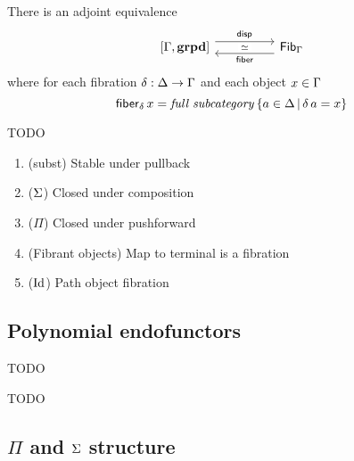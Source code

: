 \begin{prop}
  There is an adjoint equivalence
  \[\begin{tikzcd}
    {[\Ga, \grpd]} && {\Fib_\Ga}
    \arrow["{\disp{}}", shift left=2, from=1-1, to=1-3]
    \arrow["\simeq"{description}, draw=none, from=1-1, to=1-3]
    \arrow["{\fiber}", shift left=2, from=1-3, to=1-1]
  \end{tikzcd}\]
  where for each fibration $\delta : \Delta \to \Gamma$ and each
  object $x \in \Gamma$
  \[\mathsf{fiber}_{\delta} \, x = \text{\emph {full subcategory}} \, \{a \in \Delta \,|\, \delta \, a = x\}\]
\end{prop}

\medskip

\begin{prop}
  TODO
  \begin{enumerate}
    \item (\textsf{subst}) Stable under pullback
    \item ($\Sigma$) Closed under composition
    \item ($\Pi$) Closed under pushforward
    \item (Fibrant objects) Map to terminal is a fibration
    \item ($\mathrm{Id}$) Path object fibration
  \end{enumerate}
\end{prop}

\medskip

\subsection{Polynomial endofunctors}

\begin{defn}
  TODO
\end{defn}

\medskip

\begin{prop}
  TODO
\end{prop}

\medskip

\subsection{$\Pi$ and $\Sigma$ structure}


